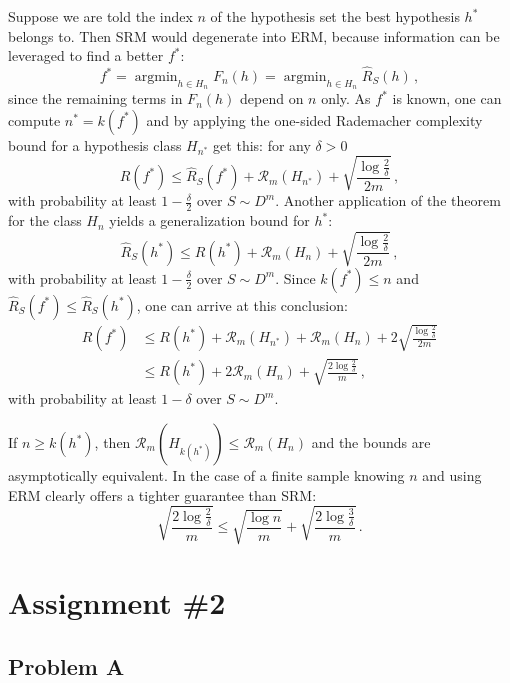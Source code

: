 \documentclass[a4paper]{article}
\newcommand{\argmin}{\mathop{\text{argmin}}}
\begin{document}
Suppose we are told the index $n$ of the hypothesis set the best hypothesis $h^*$
belongs to. Then SRM would degenerate into ERM, because information can be leveraged
to find a better $f^*$:
\[ f^* = \argmin_{h\in H_n} F_n(h) = \argmin_{h\in H_n} \hat{R}_S(h) \,,\]
since the remaining terms in $F_n(h)$ depend on $n$ only. As $f^*$ is known, one
can compute $n^* = k(f^*)$ and by applying the one-sided Rademacher complexity
bound for a hypothesis class $H_{n^*}$ get this: for any $\delta>0$
\[ R(f^*) \leq \hat{R}_S(f^*) + \mathcal{R}_m(H_{n^*})
          + \sqrt{\frac{\log\frac{2}{\delta}}{2m}}
  \,, \]
with probability at least $1-\frac{\delta}{2}$ over $S\sim D^m$. Another application
of the theorem for the class $H_n$ yields a generalization bound for $h^*$:
\[ \hat{R}_S(h^*) \leq R(h^*) + \mathcal{R}_m(H_n)
                  + \sqrt{\frac{\log\frac{2}{\delta}}{2m}}
  \,, \]
with probability at least $1-\frac{\delta}{2}$ over $S\sim D^m$. Since $k(f^*) \leq n$
and $\hat{R}_S(f^*) \leq \hat{R}_S(h^*)$, one can arrive at this conclusion:
\begin{align*}
  R(f^*)
    &\leq R(h^*) + \mathcal{R}_m(H_{n^*}) + \mathcal{R}_m(H_n)
     + 2 \sqrt{\frac{\log\frac{2}{\delta}}{2m}} \\
    &\leq R(h^*) + 2\mathcal{R}_m(H_n)
     + \sqrt{\frac{2\log\frac{2}{\delta}}{m}} \,,
\end{align*}
with probability at least $1-\delta$ over $S\sim D^m$. 

\noindent If $n \geq k(h^*)$, then $\mathcal{R}_m(H_{k(h^*)}) \leq \mathcal{R}_m(H_n)$
and the bounds are asymptotically equivalent. In the case of a finite sample knowing
$n$ and using ERM clearly offers a tighter guarantee than SRM:
\[ \sqrt{\frac{2\log\frac{2}{\delta}}{m}}
    \leq \sqrt{\frac{\log n}{m}}
      + \sqrt{\frac{2\log\frac{3}{\delta}}{m}}
  \,. \]




\section{Assignment \#2} %
\label{sec:assignment_2}

\subsection{Problem A} %
\label{sub:problem_a}
\end{document}
